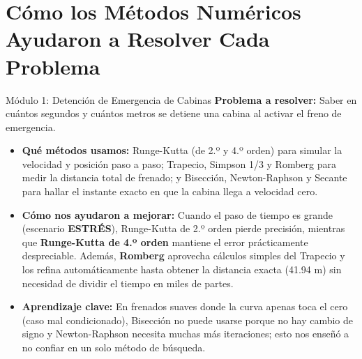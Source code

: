 \documentclass[11pt,a4paper]{article}
\begin{document}
\section{Cómo los Métodos Numéricos Ayudaron a Resolver Cada Problema}

\begin{resumenbox}{Módulo 1: Detención de Emergencia de Cabinas}
\textbf{Problema a resolver:} Saber en cuántos segundos y cuántos metros se detiene una cabina al activar el freno de emergencia.
\begin{itemize}[noitemsep]
    \item \textbf{Qué métodos usamos:} Runge-Kutta (de 2.º y 4.º orden) para simular la velocidad y posición paso a paso; Trapecio, Simpson 1/3 y Romberg para medir la distancia total de frenado; y Bisección, Newton-Raphson y Secante para hallar el instante exacto en que la cabina llega a velocidad cero.
    \item \textbf{Cómo nos ayudaron a mejorar:} Cuando el paso de tiempo es grande (escenario \textbf{ESTRÉS}), Runge-Kutta de 2.º orden pierde precisión, mientras que \textbf{Runge-Kutta de 4.º orden} mantiene el error prácticamente despreciable. Además, \textbf{Romberg} aprovecha cálculos simples del Trapecio y los refina automáticamente hasta obtener la distancia exacta (41.94 m) sin necesidad de dividir el tiempo en miles de partes.
    \item \textbf{Aprendizaje clave:} En frenados suaves donde la curva apenas toca el cero (caso mal condicionado), Bisección no puede usarse porque no hay cambio de signo y Newton-Raphson necesita muchas más iteraciones; esto nos enseñó a no confiar en un solo método de búsqueda.
\end{itemize}
\end{resumenbox}
\end{document}
